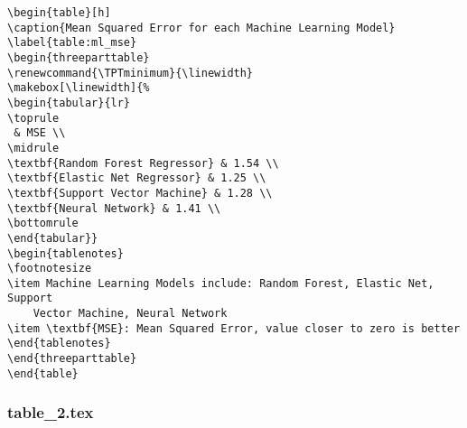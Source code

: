 \documentclass[11pt]{article}
\begin{document}
\begin{Verbatim}[tabsize=4]
\begin{table}[h]
\caption{Mean Squared Error for each Machine Learning Model}
\label{table:ml_mse}
\begin{threeparttable}
\renewcommand{\TPTminimum}{\linewidth}
\makebox[\linewidth]{%
\begin{tabular}{lr}
\toprule
 & MSE \\
\midrule
\textbf{Random Forest Regressor} & 1.54 \\
\textbf{Elastic Net Regressor} & 1.25 \\
\textbf{Support Vector Machine} & 1.28 \\
\textbf{Neural Network} & 1.41 \\
\bottomrule
\end{tabular}}
\begin{tablenotes}
\footnotesize
\item Machine Learning Models include: Random Forest, Elastic Net, Support
	Vector Machine, Neural Network
\item \textbf{MSE}: Mean Squared Error, value closer to zero is better
\end{tablenotes}
\end{threeparttable}
\end{table}

\end{Verbatim}

\subsubsection*{table\_2.tex}
\end{document}
